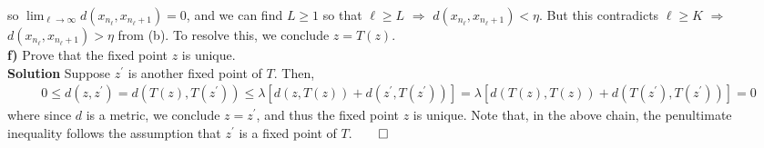 \documentclass[10pt]{article}
\newcommand{\1}[1]{\mathbbm{1}_{#1}} \newcommand{\mc}[1]{\mathcal{#1}}
\begin{document}
    so $\lim_{\ell\rightarrow\infty}d(x_{n_\ell},x_{n_\ell+1})=0$, and we can
    find $L\geq 1$ so that $\ell\geq L$ $\Rightarrow$
    $d(x_{n_\ell},x_{n_\ell+1})<\eta$. But this contradicts $\ell\geq K$
    $\Rightarrow$ $d(x_{n_\ell},x_{n_\ell+1})>\eta$ from (b). To resolve this,
    we conclude $z=T(z)$.\\[5pt]
    {\bf f)} Prove that the fixed point $z$ is unique.\\[5pt]
    {\bf Solution} Suppose $z^\prime$ is another fixed point of $T$. Then,
    \begin{align*}
        0\leq d(z,z^\prime)=d(T(z),T(z^\prime))\leq\lambda\left[d(z,T(z))+d(z^\prime,T(z^\prime))\right]=\lambda\left[d(T(z),T(z))+d(T(z^\prime),T(z^\prime))\right]=0
    \end{align*}
    where since $d$ is a metric, we conclude $z=z^\prime$, and thus the fixed
    point $z$ is unique. Note that, in the above chain, the penultimate
    inequality follows the assumption that $z^\prime$ is a fixed point of
    $T$.\hfill{$\qed$}\\[5pt]
\end{document}
